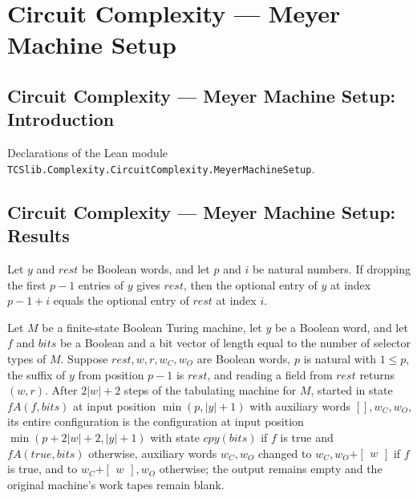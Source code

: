 \section{Circuit Complexity --- Meyer Machine Setup}
\subsection*{Circuit Complexity --- Meyer Machine Setup: Introduction}

Declarations of the Lean module \texttt{TCSlib.Complexity.CircuitComplexity.MeyerMachineSetup}.

\subsection*{Circuit Complexity --- Meyer Machine Setup: Results}

\begin{theorem}
\leanok
{}
Let $y$ and $rest$ be Boolean words, and let $p$ and $i$ be natural numbers. If dropping
the first $p-1$ entries of $y$ gives $rest$, then the optional entry of $y$ at index
$p-1+i$ equals the optional entry of $rest$ at index $i$.
\end{theorem}

\begin{theorem}
\label{Complexity.Meyer.field_some}
\leanok
{}
Let $M$ be a finite-state Boolean Turing machine, let $y$ be a Boolean word, and let $f$
and $bits$ be a Boolean and a bit vector of length equal to the number of selector types
of $M$. Suppose $rest,w,r,w_C,w_O$ are Boolean words, $p$ is natural with $1\le p$, the
suffix of $y$ from position $p-1$ is $rest$, and reading a field from $rest$ returns
$(w,r)$. After $2|w|+2$ steps of the tabulating machine for $M$, started in state
$fA(f,bits)$ at input position $\min(p,|y|+1)$ with auxiliary words $[],w_C,w_O$, its
entire configuration is the configuration at input position $\min(p+2|w|+2,|y|+1)$ with
state $cpy(bits)$ if $f$ is true and $fA(true,bits)$ otherwise, auxiliary words
$w_C,w_O$ changed to $w_C,w_O\mathbin{+\begin{bmatrix}w\end{bmatrix}}$ if $f$ is true,
and to $w_C\mathbin{+\begin{bmatrix}w\end{bmatrix}},w_O$ otherwise; the output remains
empty and the original machine's work tapes remain blank.
\end{theorem}

